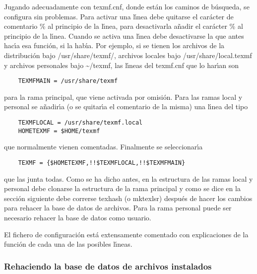 \begin{description}
	Jugando adecuadamente con {\ttfamily texmf.cnf}, donde est\'an los
	caminos de b\'usqueda, se configura sin problemas. Para activar
	una l\'\i{}nea debe quitarse el car\'acter de comentario \% al principio
	de la l\'\i{}nea, para desactivarla a\~nadir el car\'acter \% al principio
	de la l\'\i{}nea. Cuando se activa una l\'\i{}nea debe desactivarse la que
	antes hac\'\i{}a esa funci\'on, si la hab\'\i{}a. Por ejemplo, si se tienen
	los archivos de la distribuci\'on bajo {\ttfamily /usr/share/texmf/},
	archivos locales bajo {\ttfamily /usr/share/local.texmf} y archivos
	personales bajo {\ttfamily \~{}/texmf}, las l\'\i{}neas del {\ttfamily texmf.cnf} que lo har\'\i{}an son
	\begin{verbatim}
	TEXMFMAIN = /usr/share/texmf
	\end{verbatim}
 	para la rama principal, que viene activada por omisi\'on. Para las
	ramas local y personal se a\~nadir\'\i{}a (o se quitar\'\i{}a el comentario
	de la misma) una l\'\i{}nea del tipo
	\begin{verbatim}
	TEXMFLOCAL = /usr/share/texmf.local
	HOMETEXMF = $HOME/texmf
	\end{verbatim}
 	que normalmente vienen comentadas. Finalmente se seleccionar\'\i{}a
	\begin{verbatim}
	TEXMF = {$HOMETEXMF,!!$TEXMFLOCAL,!!$TEXMFMAIN}
	\end{verbatim}
 	que las junta todas. Como se ha dicho antes, en la estructura de
	las ramas local y personal debe clonarse la estructura de la
	rama principal y como se dice en la secci\'on siguiente debe
	correrse {\ttfamily texhash} (o {\ttfamily mktexlsr}) despu\'es de hacer los
	cambios para rehacer la base de datos de archivos. Para la rama
	personal puede ser necesario rehacer la base de datos como
	usuario.

	El fichero de configuraci\'on est\'a extensamente comentado con
	explicaciones de la funci\'on de cada una de las posibles l\'\i{}neas.

	\end{description}

	\subsubsection{Rehaciendo la base de datos de archivos instalados }

